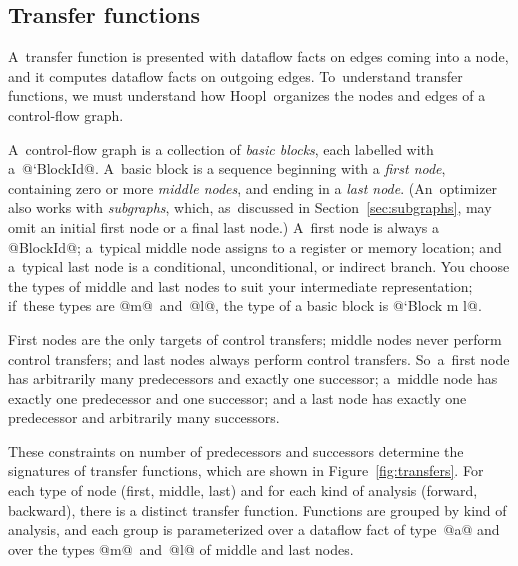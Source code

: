 \documentclass[blockstyle,preprint,natbib,nocopyrightspace]{sigplanconf}
\newcommand\ourlib{Hoopl}  %
\newcommand\secref[1]{Section~\ref{sec:#1}}
\newcommand\seclabel[1]{\label{sec:#1}}
\newcommand\figref[1]{Figure~\ref{fig:#1}}
\begin{document}
\ifpagetuning\enlargethispage{0.5\baselineskip}\fi



\subsection{Transfer functions} \seclabel{tffuns}

A~transfer function is presented with dataflow facts on edges coming
into a node, and it computes dataflow facts on outgoing edges.
To~understand transfer functions, we must 
understand how \ourlib\ organizes the nodes and edges of a control-flow graph.

\seclabel{graph.intro}

A~control-flow graph is a collection of \emph{basic blocks}, each
labelled with a~@`BlockId@.
A~basic block is a sequence beginning with a \emph{first node},
containing zero or more \emph{middle nodes},
and ending in a \emph{last node}.
(An~optimizer also works with \emph{subgraphs}, which,
as~discussed in \secref{subgraphs},  may omit an initial
first node or a final last node.)
A~first node is always a @BlockId@;
a~typical middle node assigns to a register or memory
location;
and
a~typical last node is a conditional, unconditional, or indirect branch.
You choose the types of middle and last nodes to suit your
intermediate representation; if~these types are @m@~and~@l@, the type
of a basic block is @`Block m l@.




First nodes are the only targets of control transfers;
middle nodes never perform control transfers;
and
last nodes always perform control transfers.
So~a~first node has arbitrarily many predecessors and exactly one
successor;
a~middle node has exactly one predecessor and one successor;
and a last node has exactly one predecessor and arbitrarily many
successors. 

These constraints on number of predecessors and successors determine
the signatures of 
transfer functions, 
which are shown in \figref{transfers}.
For each type of node (first, middle, last) and for each kind of
analysis (forward, backward), there is a distinct transfer function.
Functions are grouped by kind of analysis, and each group is
parameterized over a dataflow fact of type~@a@ and over the types
@m@~and~@l@ of middle and last nodes.  
\end{document}
